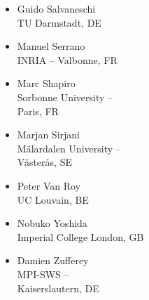\documentclass[a4paper,UKenglish]{dagrep-v2018}
\begin{document}
\begin{multicols}{3}
\begin{itemize}
  \item Guido Salvaneschi\\TU Darmstadt, DE
  \item Manuel Serrano\\INRIA -- Valbonne, FR
  \item Marc Shapiro\\Sorbonne University -- \\Paris, FR
  \item Marjan Sirjani\\M{\"a}lardalen University -- \\V{\"a}ster{\aa}s, SE
  \item Peter Van Roy\\UC Louvain, BE
  \item Nobuko Yoshida\\Imperial College London, GB
  \item Damien Zufferey\\MPI-SWS -- \\Kaiserslautern, DE
  \end{itemize}
\end{multicols}
\end{document}
